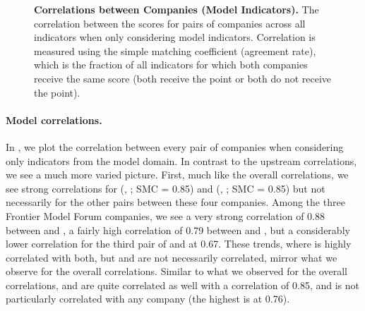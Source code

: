 \begin{figure}
\caption{\textbf{Correlations between Companies (Model Indicators).} The correlation between the scores for pairs of companies across all indicators when only considering model indicators. Correlation is measured using the simple matching coefficient (\ie agreement rate), which is the fraction of all indicators for which both companies receive the same score (\ie both receive the point or both do not receive the point).
}
\label{fig:model-correlations}
\end{figure}

\paragraph{Model correlations.}
In , we plot the correlation between every pair of companies when considering only indicators from the model domain.
In contrast to the upstream correlations, we see a much more varied picture.
First, much like the overall correlations, we see strong correlations for (\cohere, \aitwentyone; SMC = 0.85) and (\inflection, \amazon; SMC = 0.85) but not necessarily for the other pairs between these four companies. 
Among the three Frontier Model Forum companies, we see a very strong correlation of 0.88 between \google and \anthropic, a fairly high correlation of 0.79 between \openai and \anthropic, but a considerably lower correlation for the third pair of \openai and \google at 0.67.
These trends, where \anthropic is highly correlated with both, but \openai and \google are not necessarily correlated, mirror what we observe for the overall correlations.
Similar to what we observed for the overall correlations, \huggingface and \stability are quite correlated as well with a correlation of 0.85, and \meta is not particularly correlated with any company (the highest is \huggingface at 0.76).


